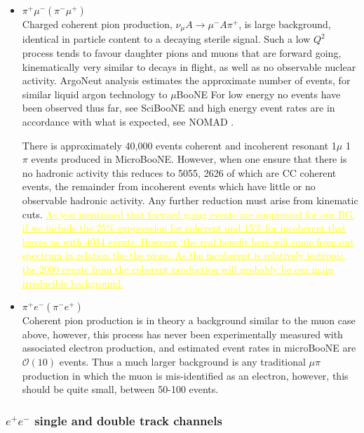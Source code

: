 \documentclass[11pt, a4paper]{article}
\newcommand{\newtext}[2]{\textcolor{#1}{\ul{#2}}}
\begin{document}
\begin{itemize}
\item {\bf $\pi^+ \mu^- (\pi^- \mu^+)$} \\
Charged coherent pion production, $\nu_\mu A \rightarrow \mu^- A \pi^+$, is large background, identical in particle content to a decaying sterile signal. Such a low $Q^2$ process tends to favour daughter pions and muons that are forward going, kinematically very similar to decays in flight, as well as no observable nuclear activity. ArgoNeut analysis estimates the approximate number of events, for similar liquid argon technology to $\mu$BooNE \cite{Acciarri:2014eit} For low energy no events have been observed thus far, see SciBooNE \cite{Tanaka:2009ag} and high energy event rates are in accordance with what is expected, see NOMAD \cite{Kullenberg:2009pu}.

There is approximately 40,000 events coherent and incoherent resonant 1$\mu$ 1 $\pi$ events produced in MicroBooNE. However, when one ensure that there is no hadronic activity this reduces to 5055, 2626 of which are CC coherent events, the remainder from incoherent events which have little or no observable hadronic activity. Any further reduction must arise from kinematic cuts. \newtext{MARK}{As you mentioned that forward going events are suppressed for our BG, if we include the 25\% suppression for coherent and 15\% for incoherent that leaves us with 4034 events. However, the real benefit here will come from out spectrum in relation the the pions. As the incoherent is relatively isotropic, the 2000 events from the coherent production will probably be our main irreducible background.} 

	
\item {\bf $\pi^+ e^- (\pi^- e^+)$} \\
	 Coherent pion production is in theory a background similar to the muon case above, however, this process has never been experimentally measured with associated electron production, and estimated event rates in microBooNE are $\mathcal{O}(10)$ events. Thus a much larger background is any traditional $\mu \pi$ production in which the muon is mis-identified as an electron, however, this should be quite small, between 50-100 events.
	\end{itemize}
	

\subsubsection{$e^+ e^-$ single and double track channels}
\end{document}
